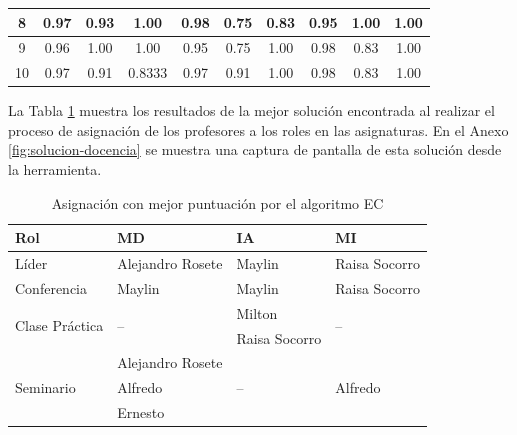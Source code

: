 \begin{table}[H]
{\begin{tabular}{|c | c | c| c | c |c |c | c| c| c |}
		               8                & 0.97                     & 0.93                     & 1.00                    & 0.98       & 0.75       & 0.83         & 0.95       & 1.00       & 1.00           \\ \hline
		               9                & 0.96                     & 1.00                     & 1.00                    & 0.95       & 0.75       & 1.00         & 0.98       & 0.83       & 1.00           \\ \hline
		              10                & 0.97                     & 0.91                     & 0.8333                  & 0.97       & 0.91       & 1.00         & 0.98       & 0.83       & 1.00           \\ \bottomrule
	\end{tabular}
}
\end{table}

La Tabla \ref{table:asingnacion-doc} muestra los resultados de la mejor solución encontrada al realizar el proceso de asignación de los profesores a los roles en las asignaturas. En el Anexo \ref{fig:solucion-docencia} se muestra una captura de pantalla de esta solución desde la herramienta.

\begin{table}[H]
	\centering
	\caption{Asignación con mejor puntuación por el algoritmo EC} \label{table:asingnacion-doc}
	\begin{tabular}{l p{3.3cm} l l}
		\toprule
		\textbf{Rol}                      & \textbf{MD}           & \textbf{IA}           & \textbf{MI}               \\ \midrule
		Líder                             & Alejandro Rosete      & Maylin                & Raisa Socorro                    \\ \hline
		Conferencia                       & Maylin                & Maylin                & Raisa Socorro         \\ \hline
		\multirow{2}{3cm}{Clase Práctica} & \multirow{2}{2cm}{--} & Milton               & \multirow{2}{2cm}{--}     \\
		                                  &                       & Raisa Socorro                 &  \\ \hline
		\multirow{3}{2cm}{Seminario}      & Alejandro Rosete      & \multirow{3}{2cm}{--} & \multirow{3}{2cm}{Alfredo} \\
		                                  & Alfredo               &                       &  \\
		                                  & Ernesto               &                       &  \\ \bottomrule
	\end{tabular}
\end{table}
 
